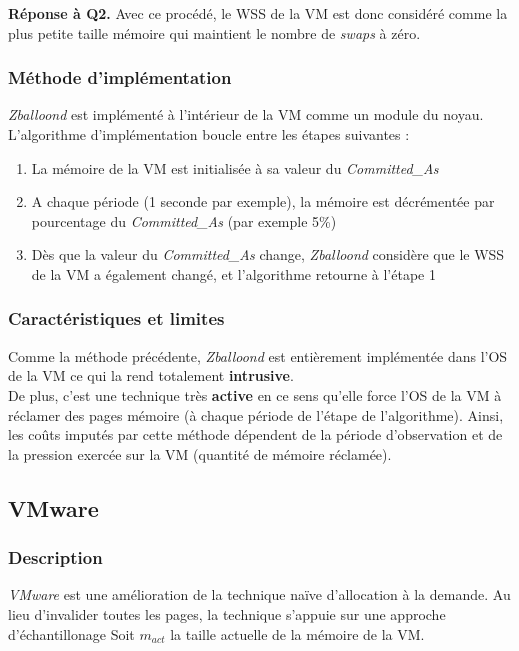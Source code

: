 \par{\textbf{Réponse à Q2.}} Avec ce procédé, le WSS de la VM est donc considéré comme la plus petite taille mémoire qui maintient le nombre de \textit{swaps} à zéro.

\subsubsection{Méthode d'implémentation}
\textit{Zballoond} est implémenté à l'intérieur de la VM comme un module du noyau. L'algorithme d'implémentation boucle entre les étapes suivantes : 
\begin{enumerate}[label=\textbf{(\roman*)}]
    \item La mémoire de la VM est initialisée à sa valeur du \textit{Committed\_As}
    \item A chaque période (1 seconde par exemple), la mémoire est décrémentée par pourcentage du \textit{Committed\_As} (par exemple 5\%)
    \item Dès que la valeur du \textit{Committed\_As} change, \textit{Zballoond} considère que le WSS de la VM a également changé, et l'algorithme retourne à l'étape 1
\end{enumerate}

\subsubsection{Caractéristiques et limites}
Comme la méthode précédente, \textit{Zballoond} est entièrement implémentée dans l'OS de la VM ce qui la rend totalement \textbf{intrusive}.\\ 
De plus, c'est une technique très \textbf{active} en ce sens qu'elle force l'OS de la VM à réclamer des pages mémoire (à chaque période de l'étape de l'algorithme). Ainsi, les coûts imputés par cette méthode dépendent de la période d'observation et de la pression exercée sur la VM (quantité de mémoire réclamée).

\subsection{VMware}

\subsubsection{Description}
\textit{VMware} \cite{article10} est une amélioration de la technique naïve d'allocation à la demande. Au lieu d'invalider toutes les pages, la technique s'appuie sur une approche d'échantillonage Soit $\textit{m}_\textit{act}$ la taille actuelle de la mémoire de la VM.

